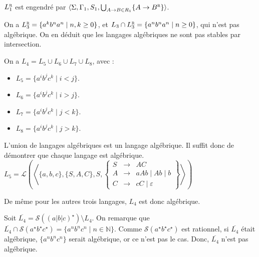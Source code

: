 \begin{corrections}
\begin{questions}
  \item $L_1^\textsc{r}$ est engendré par $\langle \Sigma, \Gamma_1, S_1, \bigcup_{A \rightarrow B \in R_1}\{ A \rightarrow B^\textsc{r} \} \rangle$.

  \item On a $L_3^{\textsc{r}} = \{a^k b^n a^n \mid n, k \geq 0\}$, et $L_3 \cap L_3^{\textsc{r}} = \{a^n b^n a^n \mid n \geq 0\}$, qui n'est pas algébrique.
    On en déduit que les langages algébriques ne sont pas stables par intersection.
    
  \item On a $L_4 = L_5 \cup L_6 \cup L_7 \cup L_8$, avec :
    \begin{itemize}
    \item $L_5 = \{a^i b^j c^k \mid i < j\}$.
    \item $L_6 = \{a^i b^j c^k \mid i > j\}$.
    \item $L_7 = \{a^i b^j c^k \mid j < k\}$.
    \item $L_8 = \{a^i b^j c^k \mid j > k\}$.
    \end{itemize}
    L'union de langages algébriques est un langage algébrique. Il suffit donc de démontrer que chaque langage est algébrique.
    $L_5 = \mathcal{L}\left(\left\langle\{a, b, c\}, \{S, A, C\}, S,
    \left\{\begin{array}{lll}
    S &\rightarrow& AC \\
    A &\rightarrow& aAb \mid Ab \mid b \\
    C &\rightarrow& cC \mid \varepsilon
    \end{array}\right\}\right\rangle\right)$
 
    De même pour les autres trois langages, $L_4$ est donc algébrique.
 
  \item Soit $\overline{L_4} = \mathcal{S}((a|b|c)^\star) \setminus L_4$.
    On remarque que $\overline{L_4} \cap \mathcal{S}(a^\star b^\star c^\star) = \{a^n b^n c^n \mid n\in \mathbb{N}\}$.
    Comme $\mathcal{S}(a^\star b^\star c^\star)$ est rationnel, si $\overline{L_4}$ était algébrique, $\{a^n b^n c^n\}$ serait algébrique, or ce n’est pas le cas.
    Donc, $\overline{L_4}$ n'est pas algébrique.

  \end{questions}

\end{corrections}

\endgroup
\endinput
